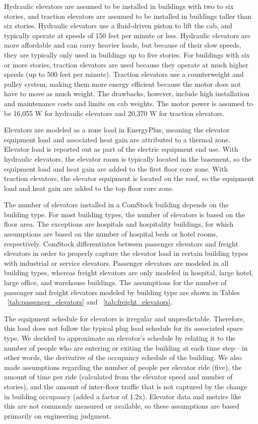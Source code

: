 Hydraulic elevators are assumed to be installed in buildings with two to six stories, and traction elevators are assumed to be installed in buildings taller than six stories. Hydraulic elevators use a fluid-driven piston to lift the cab, and typically operate at speeds of 150 feet per minute or less. Hydraulic elevators are more affordable and can carry heavier loads, but because of their slow speeds, they are typically only used in buildings up to five stories. For buildings with six or more stories, traction elevators are used because they operate at much higher speeds (up to 500 feet per minute). Traction elevators use a counterweight and pulley system, making them more energy efficient because the motor does not have to move as much weight. The drawbacks, however, include high installation and maintenance costs and limits on cab weights. The motor power is assumed to be 16,055 W for hydraulic elevators and 20,370 W for traction elevators. 

Elevators are modeled as a zone load in EnergyPlus, meaning the elevator equipment load and associated heat gain are attributed to a thermal zone. Elevator load is reported out as part of the electric equipment end use. With hydraulic elevators, the elevator room is typically located in the basement, so the equipment load and heat gain are added to the first floor core zone. With traction elevators, the elevator equipment is located on the roof, so the equipment load and heat gain are added to the top floor core zone.

The number of elevators installed in a ComStock building depends on the building type. For most building types, the number of elevators is based on the floor area. The exceptions are hospitals and hospitality buildings, for which assumptions are based on the number of hospital beds or hotel rooms, respectively. ComStock differentiates between passenger elevators and freight elevators in order to properly capture the elevator load in certain building types with industrial or service elevators. Passenger elevators are modeled in all building types, whereas freight elevators are only modeled in hospital, large hotel, large office, and warehouse buildings. The assumptions for the number of passenger and freight elevators modeled by building type are shown in Tables ~\ref{tab:passenger_elevators} and ~\ref{tab:freight_elevators}.

The equipment schedule for elevators is irregular and unpredictable. Therefore, this load does not follow the typical plug load schedule for its associated space type. We decided to approximate an elevator's schedule by relating it to the number of people who are entering or exiting the building at each time step---in other words, the derivative of the occupancy schedule of the building. We also made assumptions regarding the number of people per elevator ride (five), the amount of time per ride (calculated from the elevator speed and number of stories), and the amount of inter-floor traffic that is not captured by the change in building occupancy (added a factor of 1.2x). Elevator data and metrics like this are not commonly measured or available, so these assumptions are based primarily on engineering judgment. 

